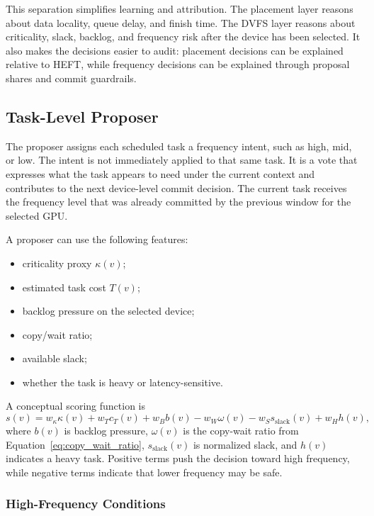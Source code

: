 This separation simplifies learning and attribution. The placement layer reasons about data locality, queue delay, and finish time. The DVFS layer reasons about criticality, slack, backlog, and frequency risk after the device has been selected. It also makes the decisions easier to audit: placement decisions can be explained relative to HEFT, while frequency decisions can be explained through proposal shares and commit guardrails.

\subsection{Task-Level Proposer}
\label{subsec:task_level_proposer}

The proposer assigns each scheduled task a frequency intent, such as high, mid, or low. The intent is not immediately applied to that same task. It is a vote that expresses what the task appears to need under the current context and contributes to the next device-level commit decision. The current task receives the frequency level that was already committed by the previous window for the selected GPU.

A proposer can use the following features:
\begin{itemize}
    \item criticality proxy $\kappa(v)$;
    \item estimated task cost $T(v)$;
    \item backlog pressure on the selected device;
    \item copy/wait ratio;
    \item available slack;
    \item whether the task is heavy or latency-sensitive.
\end{itemize}

A conceptual scoring function is
\begin{equation}
s(v) = w_{\kappa}\kappa(v) + w_T c_T(v) + w_B b(v)
       - w_W \omega(v) - w_S s_{\mathrm{slack}}(v) + w_H h(v),
\label{eq:dvfs_proposer_score}
\end{equation}
where $b(v)$ is backlog pressure, $\omega(v)$ is the copy-wait ratio from Equation~\eqref{eq:copy_wait_ratio}, $s_{\mathrm{slack}}(v)$ is normalized slack, and $h(v)$ indicates a heavy task. Positive terms push the decision toward high frequency, while negative terms indicate that lower frequency may be safe.

\subsubsection{High-Frequency Conditions}
\label{subsubsec:high_frequency_conditions}

